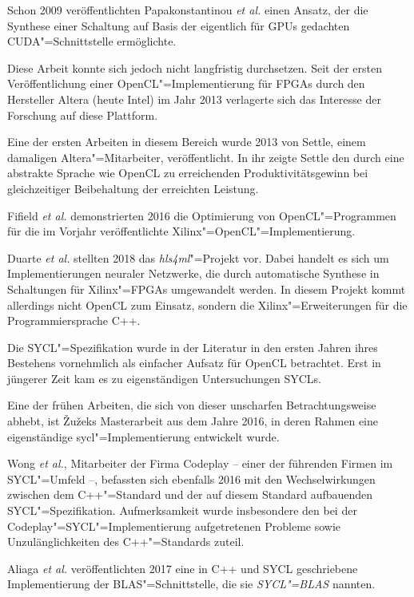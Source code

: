 Schon 2009 veröffentlichten Papakonstantinou \textit{et al.} einen Ansatz, der
die Synthese einer Schaltung auf Basis der eigentlich für GPUs gedachten
CUDA"=Schnittstelle ermöglichte. \cite[vgl.][]{papakonstantinou2009} 

Diese Arbeit konnte sich jedoch nicht langfristig durchsetzen. Seit der ersten
Veröffentlichung einer OpenCL"=Implementierung für FPGAs durch den Hersteller
Altera (heute Intel) im Jahr 2013 verlagerte sich das Interesse der Forschung
auf diese Plattform. 

Eine der ersten Arbeiten in diesem Bereich wurde 2013 von Settle, einem
damaligen Altera"=Mitarbeiter, veröffentlicht. In ihr zeigte Settle den durch
eine abstrakte Sprache wie OpenCL zu erreichenden Produktivitätsgewinn bei
gleichzeitiger Beibehaltung der erreichten Leistung. \cite[vgl.][]{settle2013}

Fifield \textit{et al.} demonstrierten 2016 die Optimierung von
OpenCL"=Programmen für die im Vorjahr veröffentlichte
Xilinx"=OpenCL"=Implementierung. \cite[vgl.][]{fifield2016}

Duarte \textit{et al.} stellten 2018 das \textit{hls4ml}"=Projekt vor. Dabei
handelt es sich um Implementierungen neuraler Netzwerke, die durch automatische
Synthese in Schaltungen für Xilinx"=FPGAs umgewandelt werden. In diesem Projekt
kommt allerdings nicht OpenCL zum Einsatz, sondern die Xilinx"=Erweiterungen für
die Programmiersprache C++. \cite[vgl.][]{duarte2018}

Die SYCL"=Spezifikation wurde in der Literatur in den ersten Jahren ihres
Bestehens vornehmlich als einfacher Aufsatz für OpenCL betrachtet. Erst in
jüngerer Zeit kam es zu eigenständigen Untersuchungen SYCLs.

Eine der frühen Arbeiten, die sich von dieser unscharfen Betrachtungsweise
abhebt, ist Žužeks Masterarbeit aus dem Jahre 2016, in deren Rahmen eine
eigenständige \gls{sycl}"=Implementierung entwickelt wurde.
\cite[vgl.][]{zuzek2016}

Wong \textit{et al.}, Mitarbeiter der Firma Codeplay -- einer der führenden
Firmen im SYCL"=Umfeld --, befassten sich ebenfalls 2016 mit den
Wechselwirkungen zwischen dem C++"=Standard und der auf diesem Standard
aufbauenden SYCL"=Spezifikation. Aufmerksamkeit wurde insbesondere den bei der
Codeplay"=SYCL"=Implementierung aufgetretenen Probleme sowie Unzulänglichkeiten
des C++"=Standards zuteil.
\cite[vgl.][]{wong2016}

Aliaga \textit{et al.} veröffentlichten 2017 eine in C++ und SYCL geschriebene
Implementierung der BLAS"=Schnittstelle, die sie \textit{SYCL"=BLAS} nannten.
\cite[vgl.][]{aliaga2017}


